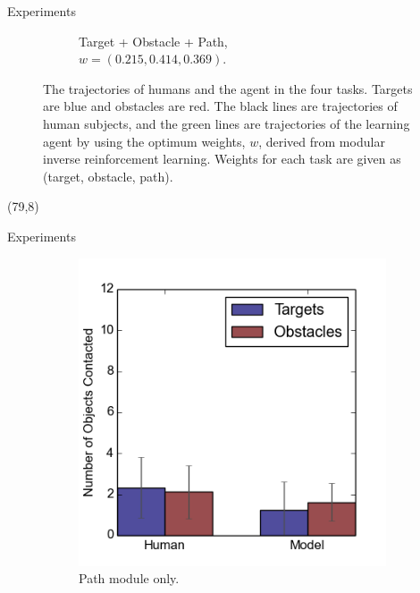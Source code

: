 \documentclass[final]{beamer}
\begin{document}
\begin{frame}{}
\begin{textblock}{37}
\begin{block}{Experiments}
\begin{figure}[h]
\begin{subfigure}[b]{0.4\textwidth}
\caption{Target + Obstacle + Path, \\$w = (0.215, 0.414, 0.369)$. }
\end{subfigure}
\caption{The trajectories of humans and the agent in the four tasks. Targets are blue and obstacles are red. The
black lines are trajectories of human subjects, and the green lines are
trajectories of the learning agent by using the optimum weights, $w$, derived
from modular inverse reinforcement learning. Weights for each task are given as (target,
obstacle, path).}
\label{fig:exp}
\end{figure}

\end{block}
\end{textblock}

\begin{textblock}{37}(79,8)
\begin{block}{Experiments}
\begin{figure}[h]
\centering
\begin{subfigure}[b]{0.24\textwidth}
\includegraphics[width=\textwidth]{contact1.png}
\caption{Path module only. }
\end{subfigure}
\begin{subfigure}[b]{0.24\textwidth}

\end{subfigure}
\end{figure}
\end{block}
\end{textblock}
\end{frame}
\end{document}
